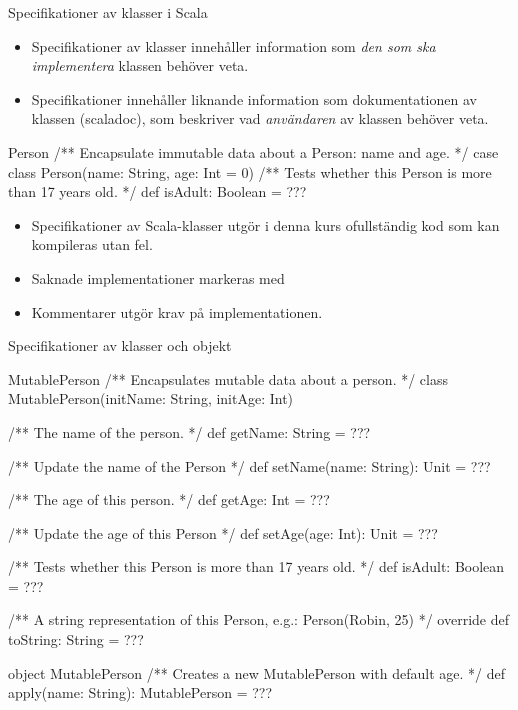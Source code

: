\begin{Slide}{Specifikationer av klasser i Scala}\footnotesize
\begin{itemize}
\item Specifikationer av klasser innehåller information som \emph{den som ska implementera} klassen behöver veta.
\item Specifikationer innehåller liknande information som dokumentationen av klassen (scaladoc), som beskriver vad \emph{användaren} av klassen behöver veta.  
\end{itemize}
\begin{ScalaSpec}{Person}
/** Encapsulate immutable data about a Person: name and age. */ 
case class Person(name: String, age: Int = 0){
  /** Tests whether this Person is more than 17 years old. */
  def isAdult: Boolean = ???
}
\end{ScalaSpec}
\begin{itemize}
\item Specifikationer av Scala-klasser utgör i denna kurs ofullständig kod som kan kompileras utan fel. 
\item Saknade implementationer markeras med 
\item Kommentarer utgör krav på implementationen.
\end{itemize}

\end{Slide}


\begin{Slide}{Specifikationer av klasser och objekt}
\begin{ScalaSpec}{MutablePerson}
/** Encapsulates mutable data about a person. */
class MutablePerson(initName: String, initAge: Int){
  /** The name of the person. */
  def getName: String = ???
  
  /** Update the name of the Person */
  def setName(name: String): Unit = ???

  /** The age of this person. */
  def getAge: Int = ???

  /** Update the age of this Person */
  def setAge(age: Int): Unit = ???

  /** Tests whether this Person is more than 17 years old. */
  def isAdult: Boolean = ???

  /** A string representation of this Person, e.g.: Person(Robin, 25) */
  override def toString: String = ???
}
object MutablePerson {
  /** Creates a new MutablePerson with default age. */
  def apply(name: String): MutablePerson = ???
}
\end{ScalaSpec}

\end{Slide}

